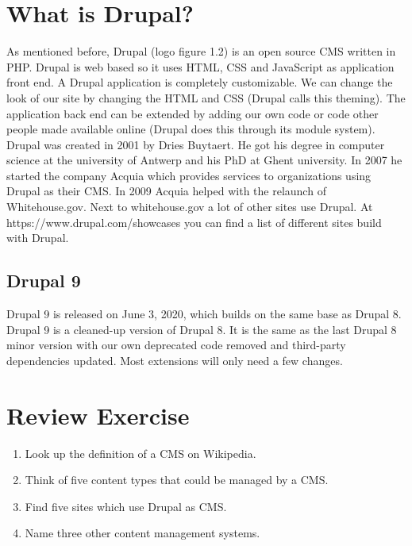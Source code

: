 \section{What is Drupal?}
As mentioned before, Drupal (logo figure 1.2) is an open source CMS written in PHP. Drupal is web based so it uses HTML, CSS and JavaScript as application front end. A Drupal application is completely customizable. We can change the look of our site by changing the HTML and CSS (Drupal calls this theming).
The application back end can be extended by adding our own code or code other people made available online (Drupal does this through its module system).
Drupal was created in 2001 by Dries Buytaert. He got his degree in computer science at the university of Antwerp and his PhD at Ghent university. In 2007 he started the company Acquia which provides services to organizations using Drupal as their CMS. In 2009 Acquia helped with the relaunch of Whitehouse.gov. Next to whitehouse.gov a lot of other sites use Drupal. At https://www.drupal.com/showcases you can find a list of different sites build with Drupal.

\subsection{Drupal 9}
Drupal 9 is released on June 3, 2020, which builds on the same base as Drupal 8. Drupal 9 is a cleaned-up version of Drupal 8. It is the same as the last Drupal 8 minor version with our own deprecated code removed and third-party dependencies updated. Most extensions will only need a few changes.

\section{Review Exercise}
\begin{enumerate}
    \item Look up the definition of a CMS on Wikipedia.
    \item Think of five content types that could be managed by a CMS.
    \item Find five sites which use Drupal as CMS.
    \item Name three other content management systems.
\end{enumerate}
